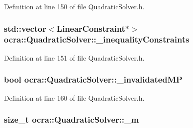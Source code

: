 Definition at line 150 of file Quadratic\+Solver.\+h.

\subsubsection[{\texorpdfstring{\+\_\+inequality\+Constraints}{_inequalityConstraints}}]{\setlength{\rightskip}{0pt plus 5cm}std\+::vector$<${\bf Linear\+Constraint}$\ast$$>$ ocra\+::\+Quadratic\+Solver\+::\+\_\+inequality\+Constraints\hspace{0.3cm}{\ttfamily [protected]}}\hypertarget{classocra_1_1QuadraticSolver_af8ca3b3596faeedf97437b9b7d85a7f3}{}\label{classocra_1_1QuadraticSolver_af8ca3b3596faeedf97437b9b7d85a7f3}


Definition at line 151 of file Quadratic\+Solver.\+h.

\subsubsection[{\texorpdfstring{\+\_\+invalidated\+MP}{_invalidatedMP}}]{\setlength{\rightskip}{0pt plus 5cm}bool ocra\+::\+Quadratic\+Solver\+::\+\_\+invalidated\+MP\hspace{0.3cm}{\ttfamily [protected]}}\hypertarget{classocra_1_1QuadraticSolver_aadb395a0722e77c9ea19ed8968916c0e}{}\label{classocra_1_1QuadraticSolver_aadb395a0722e77c9ea19ed8968916c0e}


Definition at line 160 of file Quadratic\+Solver.\+h.

\subsubsection[{\texorpdfstring{\+\_\+m}{_m}}]{\setlength{\rightskip}{0pt plus 5cm}size\+\_\+t ocra\+::\+Quadratic\+Solver\+::\+\_\+m\hspace{0.3cm}{\ttfamily [protected]}}\hypertarget{classocra_1_1QuadraticSolver_a7138115950652cc14b22ca87d8fc8b64}{}\label{classocra_1_1QuadraticSolver_a7138115950652cc14b22ca87d8fc8b64}


